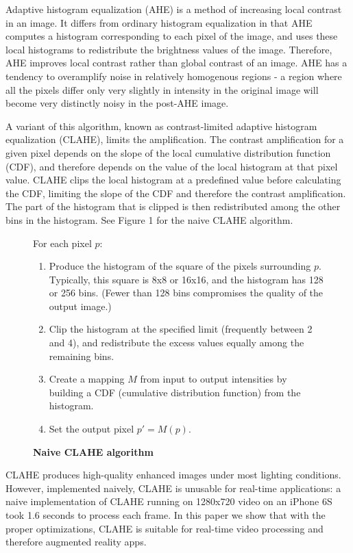 \documentclass[10pt,twocolumn,letterpaper]{article}
\begin{document}
Adaptive histogram equalization (AHE) is a method of increasing local contrast in an image. It differs from ordinary histogram equalization in that AHE computes a histogram corresponding to each pixel of the image, and uses these local histograms to redistribute the brightness values of the image. Therefore, AHE improves local contrast rather than global contrast of an image. AHE has a tendency to overamplify noise in relatively homogenous regions - a region where all the pixels differ only very slightly in intensity in the original image will become very distinctly noisy in the post-AHE image.

A variant of this algorithm, known as contrast-limited adaptive histogram equalization (CLAHE), limits the amplification. The contrast amplification for a given pixel depends on the slope of the local cumulative distribution function (CDF), and therefore depends on the value of the local histogram at that pixel value. CLAHE clips the local histogram at a predefined value before calculating the CDF, limiting the slope of the CDF and therefore the contrast amplification. The part of the histogram that is clipped is then redistributed among the other bins in the histogram. See Figure 1 for the naive CLAHE algorithm.

\begin{figure}[h]
\caption{\textbf{Naive CLAHE algorithm}}
For each pixel $p$: 
\begin{enumerate}
\itemsep0em 
\item Produce the histogram of the square of the pixels surrounding $p$. Typically, this square is 8x8 or 16x16, and the histogram has 128 or 256 bins. (Fewer than 128 bins compromises the quality of the output image.)
\item Clip the histogram at the specified limit (frequently between 2 and 4), and redistribute the excess values equally among the remaining bins. 
\item Create a mapping $M$ from input to output intensities by building a CDF (cumulative distribution function) from the histogram.
\item Set the output pixel $p' = M(p)$.
\end{enumerate}
\end{figure}

CLAHE produces high-quality enhanced images under most lighting conditions. However, implemented naively, CLAHE is unusable for real-time applications: a naive implementation of CLAHE running on 1280x720 video on an iPhone 6S took 1.6 seconds to process each frame. In this paper we show that with the proper optimizations, CLAHE is suitable for real-time video processing and therefore augmented reality apps.
\end{document}
